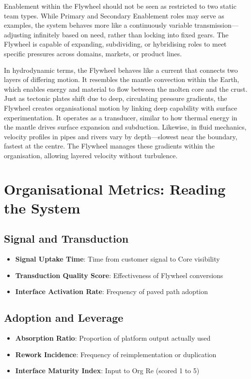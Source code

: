 \documentclass[11pt]{article}
\begin{document}
Enablement within the Flywheel should not be seen as restricted to two static team types. While Primary and Secondary Enablement roles may serve as examples, the system behaves more like a continuously variable transmission---adjusting infinitely based on need, rather than locking into fixed gears. The Flywheel is capable of expanding, subdividing, or hybridising roles to meet specific pressures across domains, markets, or product lines.

In hydrodynamic terms, the Flywheel behaves like a current that connects two layers of differing motion. It resembles the mantle convection within the Earth, which enables energy and material to flow between the molten core and the crust. Just as tectonic plates shift due to deep, circulating pressure gradients, the Flywheel creates organisational motion by linking deep capability with surface experimentation. It operates as a transducer, similar to how thermal energy in the mantle drives surface expansion and subduction. Likewise, in fluid mechanics, velocity profiles in pipes and rivers vary by depth---slowest near the boundary, fastest at the centre. The Flywheel manages these gradients within the organisation, allowing layered velocity without turbulence.

\section{Organisational Metrics: Reading the System}

\subsection*{Signal and Transduction}
\begin{itemize}
  \item \textbf{Signal Uptake Time}: Time from customer signal to Core visibility
  \item \textbf{Transduction Quality Score}: Effectiveness of Flywheel conversions
  \item \textbf{Interface Activation Rate}: Frequency of paved path adoption
\end{itemize}

\subsection*{Adoption and Leverage}
\begin{itemize}
  \item \textbf{Absorption Ratio}: Proportion of platform output actually used
  \item \textbf{Rework Incidence}: Frequency of reimplementation or duplication
  \item \textbf{Interface Maturity Index}: Input to Org Re (scored 1 to 5)
\end{itemize}
\end{document}
